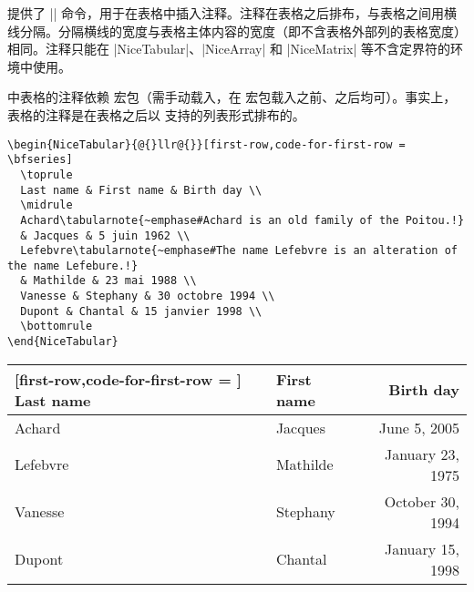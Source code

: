 \documentclass[dvipsnames]{article}%
\begin{document}

 提供了 |\tabularnote| 命令，用于在表格中插入注释。注释在表格之后排布，与表格之间用横线分隔。分隔横线的宽度与表格主体内容的宽度（即不含表格外部列的表格宽度）相同。注释只能在 |{NiceTabular}|、|{NiceArray}| 和 |{NiceMatrix}| 等不含定界符的环境中使用。


 中表格的注释依赖  宏包（需手动载入，在  宏包载入之前、之后均可）。事实上，表格的注释是在表格之后以  支持的列表形式排布的。

\begin{scope}
\begin{Verbatim}
\begin{NiceTabular}{@{}llr@{}}[first-row,code-for-first-row = \bfseries]
  \toprule
  Last name & First name & Birth day \\
  \midrule
  Achard\tabularnote{~emphase#Achard is an old family of the Poitou.!} 
  & Jacques & 5 juin 1962 \\
  Lefebvre\tabularnote{~emphase#The name Lefebvre is an alteration of the name Lefebure.!} 
  & Mathilde & 23 mai 1988 \\
  Vanesse & Stephany & 30 octobre 1994 \\
  Dupont & Chantal & 15 janvier 1998 \\
  \bottomrule
\end{NiceTabular}
\end{Verbatim}
\end{scope}

\begin{center}
\begin{NiceTabular}{@{}llr@{}}[first-row,code-for-first-row = \bfseries]
\toprule
Last name & First name & Birth day \\
\midrule
Achard 
& Jacques & June 5, 2005 \\
Lefebvre 
& Mathilde & January 23, 1975 \\
Vanesse & Stephany & October 30, 1994 \\
Dupont & Chantal & January 15, 1998 \\
\bottomrule
\end{NiceTabular}
\end{center}
\end{document}
